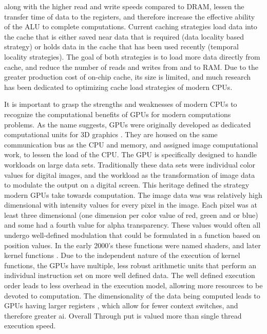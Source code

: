 along with the higher read and write speeds compared to \gls{DRAM}, lessen the transfer
time of data to the registers, and therefore increase the effective ability of the
 \gls{ALU} to complete computations. Current caching strategies load data into
 the cache that is either saved near data that is required (data locality based strategy)
 or holds data in the cache that has been used recently (temporal locality strategies).
 The goal of both strategies is to load more data directly from cache, and reduce
 the number of reads and writes from and to \gls{RAM}.
Due to the greater production cost of on-chip cache, its size is limited, and
much research has been dedicated to optimizing cache load strategies of modern CPUs.
\par

It is important to grasp the strengths and weaknesses of modern \glspl{CPU} to
recognize the computational benefits of \glspl{GPU}
for modern computations problems.  As the name suggests, \glspl{GPU} were originally developed
as dedicated computational units for 3D graphics \cite{Sanders}.  They are housed on the same
communication bus as the \gls{CPU} and memory, and assigned image computational work,
to lessen the load of the \gls{CPU}.
The GPU is specifically designed to handle workloads on large data sets. Traditionally these
data sets were individual color values for digital images, and the workload as
the transformation of image data to modulate the output on a digital screen.
This heritage defined the strategy modern GPUs take towards computation.
The image data was was relatively high dimensional with intensity values for every pixel in the image.
Each pixel was at least three dimensional (one dimension per color value of red, green and or blue) and
some had a fourth value for alpha transparency. These values would often all undergo
well-defined modulation that could be formulated in a function based on position values.
In the early 2000's these functions were named shaders, and later kernel functions \cite{5751939}.
Due to the independent nature of the execution of kernel functions, the GPUs have multiple, less robust
arithmetic units that perform an individual instruction set on more well defined data.
The well defined execution order leads to less overhead in the execution
model, allowing more resources to be devoted to computation.
The dimensionality of the data being computed leads to \Glspl{GPU} having larger registers \cite{5751939},
which allow for fewer context switches, and therefore greater \gls{ai}.  Overall
Through put is valued more than single thread execution speed.  %

